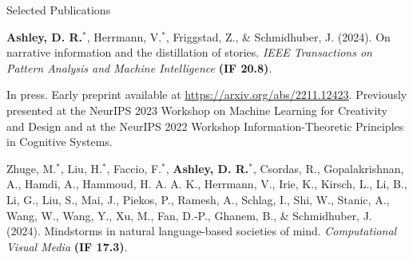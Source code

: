 \documentclass{cv}
\begin{document}
\begin{rSection}{Selected Publications}

\begin{rPublications}
    \item
        \textbf{Ashley, D. R.}$^*$, Herrmann, V.$^*$, Friggstad, Z., \& Schmidhuber, J.
        (2024).
        On narrative information and the distillation of stories.
        \textit{IEEE Transactions on Pattern Analysis and Machine Intelligence}
        \textbf{(IF 20.8)}.

        \vspace{-0.4em} In press. Early preprint available at \url{https://arxiv.org/abs/2211.12423}. Previously presented at the NeurIPS 2023 Workshop on Machine Learning for Creativity and Design and at the NeurIPS 2022 Workshop Information-Theoretic Principles in Cognitive Systems.
    \item
        Zhuge, M.$^*$, Liu, H.$^*$, Faccio, F.$^*$, \textbf{Ashley, D. R.}$^*$, Csordas, R., Gopalakrishnan, A., Hamdi, A., Hammoud, H. A. A. K., Herrmann, V., Irie, K., Kirsch, L., Li, B., Li, G., Liu, S., Mai, J., Piekos, P., Ramesh, A., Schlag, I., Shi, W., Stanic, A., Wang, W., Wang, Y., Xu, M., Fan, D.-P., Ghanem, B., \& Schmidhuber, J.
        (2024).
        Mindstorms in natural language-based societies of mind.
        \textit{Computational Visual Media} \textbf{(IF 17.3)}.


\end{rPublications}
\end{rSection}
\end{document}
